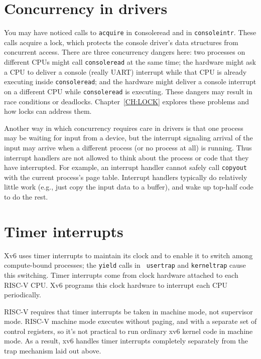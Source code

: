 \section{Concurrency in drivers}

You may have noticed calls to {\tt acquire} in {\texttt consoleread}
and in {\tt consoleintr}. These calls acquire a lock, which protects
the console driver's data structures from concurrent access.
There are three concurrency dangers here: two processes on
different CPUs might call {\tt consoleread} at the same time;
the hardware might ask a CPU to deliver a console (really 
UART) interrupt while that CPU is already executing inside
{\tt consoleread};
and the hardware might deliver a console interrupt on
a different CPU while {\tt consoleread} is executing.
These dangers may result in race conditions or deadlocks.
Chapter~\ref{CH:LOCK} explores these problems and how locks can
address them.

Another way in which concurrency requires care in drivers is that one
process may be waiting for input from a device, but the interrupt
signaling arrival of the input may arrive when a different process (or
no process at all) is running. Thus interrupt handlers are not allowed
to think about the process or code that they have interrupted. For
example, an interrupt handler cannot safely call {\tt copyout} with
the current process's page table. Interrupt handlers typically do
relatively little work (e.g., just copy the input data to a buffer),
and wake up top-half code to do the rest.

\section{Timer interrupts}

Xv6 uses timer interrupts to maintain its clock and to enable it to
switch among compute-bound processes; the {\tt yield} calls in {\tt
  usertrap} and {\tt kerneltrap} cause this switching. Timer
interrupts come from clock hardware attached to each RISC-V CPU. Xv6
programs this clock hardware to interrupt each CPU periodically.

RISC-V requires that timer interrupts be taken in machine mode, not
supervisor mode. RISC-V machine mode executes without paging, and with
a separate set of control registers, so it's not practical to run
ordinary xv6 kernel code in machine mode. As a result, xv6 handles
timer interrupts completely separately from the trap mechanism laid
out above.


